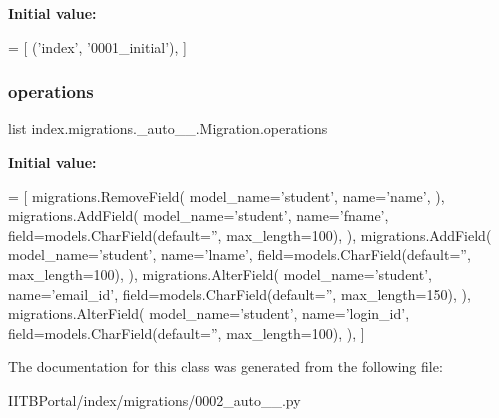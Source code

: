 {\bfseries Initial value\+:}
\begin{DoxyCode}
=  [
        (\textcolor{stringliteral}{'index'}, \textcolor{stringliteral}{'0001\_initial'}),
    ]
\end{DoxyCode}
\mbox{\label{classindex_1_1migrations_1_10002__auto__20171008__1143_1_1Migration_a4f76eebcc034b37032fb193b3e9fa6d3}} 
\subsubsection{\texorpdfstring{operations}{operations}}
{\footnotesize\ttfamily list index.\+migrations.\+\_\+auto\+\_\+\_.\+Migration.\+operations\hspace{0.3cm}{\ttfamily [static]}}

{\bfseries Initial value\+:}
\begin{DoxyCode}
=  [
        migrations.RemoveField(
            model\_name=\textcolor{stringliteral}{'student'},
            name=\textcolor{stringliteral}{'name'},
        ),
        migrations.AddField(
            model\_name=\textcolor{stringliteral}{'student'},
            name=\textcolor{stringliteral}{'fname'},
            field=models.CharField(default=\textcolor{stringliteral}{''}, max\_length=100),
        ),
        migrations.AddField(
            model\_name=\textcolor{stringliteral}{'student'},
            name=\textcolor{stringliteral}{'lname'},
            field=models.CharField(default=\textcolor{stringliteral}{''}, max\_length=100),
        ),
        migrations.AlterField(
            model\_name=\textcolor{stringliteral}{'student'},
            name=\textcolor{stringliteral}{'email\_id'},
            field=models.CharField(default=\textcolor{stringliteral}{''}, max\_length=150),
        ),
        migrations.AlterField(
            model\_name=\textcolor{stringliteral}{'student'},
            name=\textcolor{stringliteral}{'login\_id'},
            field=models.CharField(default=\textcolor{stringliteral}{''}, max\_length=100),
        ),
    ]
\end{DoxyCode}


The documentation for this class was generated from the following file\+:\begin{DoxyCompactItemize}
\item 
I\+I\+T\+B\+Portal/index/migrations/0002\+\_\+auto\+\_\+\_.\+py\end{DoxyCompactItemize}
